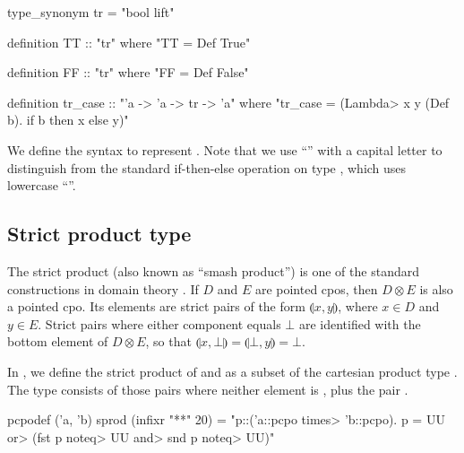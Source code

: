 \begin{isacode}
type_synonym tr = "bool lift"
\end{isacode}
\unmedskip
{}
\begin{isacode}
definition TT :: "tr"
  where "TT = Def True"
\end{isacode}
\unmedskip
{}
\begin{isacode}
definition FF :: "tr"
  where "FF = Def False"
\end{isacode}
\unmedskip
{}
\begin{isacode}
definition tr_case :: "'a -> 'a -> tr -> 'a"
  where "tr_case = (\<Lambda> x y (Def b). if b then x else y)"
\end{isacode}

\noindent
We define the syntax  to represent . Note that we use ``'' with a capital letter to distinguish from the standard if-then-else operation on type , which uses lowercase ``''.


\subsection{Strict product type}
\label{sec:holcf-sprod}

The strict product (also known as ``smash product'') is one of the standard constructions in domain theory \cite{gunter90semantic, gunter92semantics, amadio+curien}. If $D$ and $E$ are pointed cpos, then $D \otimes E$ is also a pointed cpo. Its elements are strict pairs of the form $\llparenthesis x, y \rrparenthesis$, where $x \in D$ and $y \in E$. Strict pairs where either component equals $\bot$ are identified with the bottom element of $D \otimes E$, so that $\llparenthesis x, \bot \rrparenthesis = \llparenthesis \bot, y \rrparenthesis = \bot$.

In , we define the strict product of  and  as a subset of the cartesian product type . The type consists of those pairs where neither element is , plus the pair .

\begin{isacode}
pcpodef ('a, 'b) sprod  (infixr "**" 20) =
  "{p::('a::pcpo \<times> 'b::pcpo). p = UU \<or> (fst p \<noteq> UU \<and> snd p \<noteq> UU)}"
\end{isacode}

